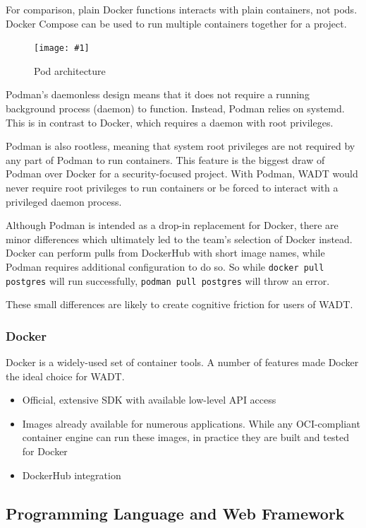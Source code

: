 \documentclass[12pt]{article}
\newcommand{\simplegraphic}[3] {
\begin{figure}[H]
	\centering
	\texttt{[image: \#1]}
	\caption{#2}
	\label{#3}
\end{figure}
}
\begin{document}
For comparison, plain Docker functions interacts with plain containers, not pods. Docker Compose can be used to run multiple containers together for a project.

\simplegraphic{podman-pod-architecture}{Pod architecture \cite{podman}}{fig:podman}

Podman's daemonless design means that it does not require a running background process (daemon) to function. Instead, Podman relies on systemd. This is in contrast to Docker, which requires a daemon with root privileges.

Podman is also rootless, meaning that system root privileges are not required by any part of Podman to run containers. This feature is the biggest draw of Podman over Docker for a security-focused project. With Podman, WADT would never require root privileges to run containers or be forced to interact with a privileged daemon process.

Although Podman is intended as a drop-in replacement for Docker, there are minor differences which ultimately led to the team's selection of Docker instead. Docker can perform pulls from DockerHub with short image names, while Podman requires additional configuration to do so. So while \texttt{docker pull postgres} will run successfully, \texttt{podman pull postgres} will throw an error.

These small differences are likely to create cognitive friction for users of WADT.


\subsubsection{Docker}
Docker is a widely-used set of container tools. A number of features made Docker the ideal choice for WADT.
\begin{itemize}
	\item Official, extensive SDK with available low-level API access
	\item Images already available for numerous applications. While any OCI-compliant container engine can run these images, in practice they are built and tested for Docker
	\item DockerHub integration
\end{itemize}

\subsection{Programming Language and Web Framework}
\end{document}
